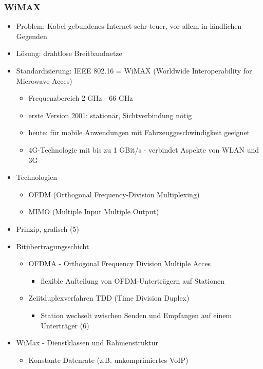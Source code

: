 \subsubsection{WiMAX}
\begin{itemize}
  \item Problem: Kabel-gebundenes Internet sehr teuer, vor allem in ländlichen Gegenden
  \item Lösung: drahtlose Breitbandnetze
  \item Standardisierung: IEEE 802.16 = WiMAX (Worldwide Interoperability for Microwave Acces)
  \begin{itemize}
  	\item Frequenzbereich 2 GHz - 66 GHz
  	\item erste Version 2001: stationär, Sichtverbindung nötig
  	\item heute: für mobile Anwendungen mit Fahrzeuggeschwindigkeit geeignet
  	\item 4G-Technologie mit bis zu 1 GBit/s - verbindet Aspekte von WLAN und 3G
  \end{itemize}
  \item Technologien
  \begin{itemize}
  	\item OFDM (Orthogonal Frequency-Division Multiplexing)
  	\item MIMO (Multiple Input Multiple Output)
  \end{itemize}
  \item Prinzip, grafisch (5)
  \item Bitübertragungsschicht
  \begin{itemize}
  	\item OFDMA - Orthogonal Frequency Division Multiple Acces
  	\begin{itemize}
  		\item flexible Aufteilung von OFDM-Unterträgern auf Stationen
  	\end{itemize}
  	\item Zeiitduplexverfahren TDD (Time Division Duplex)
  	\begin{itemize}
  		\item Station wechselt zwischen Senden und Empfangen auf einem Unterträger (6)
  	\end{itemize}
  	\end{itemize}
 	\item WiMax - Dienstklassen und Rahmenstruktur
  	\begin{itemize}
  		\item Konstante Datenrate (z.B. unkomprimiertes VoIP)

\end{itemize}
\end{itemize}
